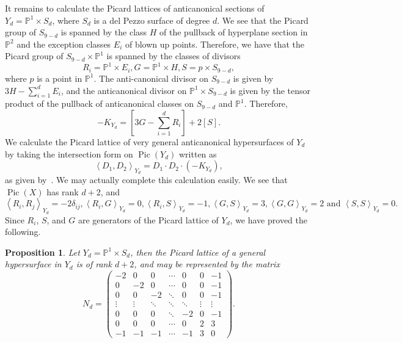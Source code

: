 \documentclass[10pt]{amsart}
\numberwithin{equation}{section}
\theoremstyle{plain}
\newtheorem{proposition}[theorem]{Proposition}
\theoremstyle{definition}
\theoremstyle{remark}
\DeclareMathOperator{\Pic}{Pic}
\begin{document}
It remains to calculate the Picard lattices of anticanonical sections of \(Y_d = \mathbb{P}^1 \times S_d\), where \(S_d\) is a del Pezzo surface of degree \(d\). We see that the Picard group of \(S_{9-d}\) is spanned by the class \(H\) of the pullback of hyperplane section in \(\mathbb{P}^2\) and the exception classes \(E_i\) of blown up points. Therefore, we have that the Picard group of \(S_{9-d} \times \mathbb{P}^1\) is spanned by the classes of divisors
\[
  R_i = \mathbb{P}^1 \times E_i, G = \mathbb{P}^1 \times H, S= p \times S_{9-d},
\]
where \(p\) is a point in \(\mathbb{P}^1\). The anti-canonical divisor on \(S_{9-d}\) is given by \(3H - \sum_{i = 1}^d E_i\), and the anticanonical divisor on \(\mathbb{P}^1 \times S_{9-d}\) is given by the tensor product of the pullback of anticanonical classes on \(S_{9-d}\) and \(\mathbb{P}^1\). Therefore,
\[
  -K_{Y_d} = \left[ 3G - \sum_{i=1}^d R_i\right] + 2 \left[S\right].
\]
We calculate the Picard lattice of very general anticanonical hypersurfaces of \(Y_d\) by taking the intersection form on \(\Pic(Y_d)\) written as
\[
  \left< D_1, D_2 \right>_{Y_d} = D_1 \cdot D_2 \cdot (-K_{Y_d}),
\]
as given by~\cite{beauvillefano}. We may actually complete this calculation easily. We see that \(\Pic(X)\) has rank \(d + 2\), and
\[
  \left<R_i, R_j\right>_{Y_d} = -2\delta_{ij}, \left<R_i,G\right>_{Y_d} = 0, \left< R_i, S \right>_{Y_d} = -1, \left<G,S\right>_{Y_d} = 3, \left<G,G\right>_{Y_d} = 2  \text{ and } \left< S, S \right>_{Y_d} = 0.
\]
Since \(R_i\), \(S\), and \(G\) are generators of the Picard lattice of \(Y_d\), we have proved the following.

\begin{proposition}
  Let \(Y_d = \mathbb{P}^1 \times S_d\), then the Picard lattice of a general hypersurface in \(Y_d\) is of rank \(d+2\), and may be represented by the matrix
  \[
    N_d= \left(
      \begin{matrix}
        -2 & 0 & 0 & \cdots & 0 & 0 & -1 \\
        0 & -2 & 0 & \cdots & 0 & 0 & -1 \\
        0 & 0 & -2 & \ddots & 0 & 0 & -1 \\
        \vdots & \vdots & \ddots & \ddots  & \ddots & \vdots & \vdots \\
        0 & 0 & 0 & \ddots & -2 & 0 & -1 \\
        0 & 0 & 0 & \cdots & 0 & 2 & 3 \\
        -1 & -1 &-1 & \cdots & -1 & 3 & 0
      \end{matrix}
    \right).
  \]
\end{proposition}
\end{document}
